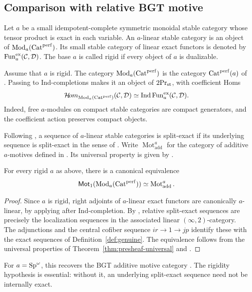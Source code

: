 \subsection{Comparison with relative BGT motive}

Let $a$ be a small idempotent-complete symmetric
monoidal stable category whose tensor product is
exact in each variable. An $a$-linear stable category
is an object of $\operatorname{Mod}_a(\operatorname{Cat}^{\mathrm{perf}})$.
Its small stable category of linear exact functors
is denoted by
$\operatorname{Fun}_a^{\mathrm{ex}}(\mathcal C,\mathcal D)$.
The base $a$ is called rigid if every object of $a$
is dualizable.


Assume that $a$ is rigid. The category
$\operatorname{Mod}_a(\operatorname{Cat}^{\mathrm{perf}})$ is the category
$\operatorname{Cat}^{\mathrm{perf}}(a)$ of
\citep[Definition~4.3]{HSS}.
Passing to Ind-completions makes it an object of
${2}\mathrm{Pr}_{\mathrm{st}}$, with coefficient Homs
\begin{equation}\label{eq:linear-Hom}
 \mathcal{H}\!om_{\operatorname{Mod}_a(\operatorname{Cat}^{\mathrm{perf}})}
       (\mathcal C,\mathcal D)
 \simeq\operatorname{Ind}\operatorname{Fun}_a^{\mathrm{ex}}(\mathcal C,\mathcal D).
\end{equation}
Indeed, free $a$-modules on compact stable
categories are compact generators, and the
coefficient action preserves compact objects.

\begin{definition}\label{def:relative-additive-motives}
Following \citep[Definition~5.3]{HSS}, a sequence
of $a$-linear stable categories is split-exact
if its underlying sequence is split-exact in
the sense of \citep[Definition~5.18]{BGT}.
Write $\operatorname{Mot}_{\mathrm{add}}^a$
for the category of additive $a$-motives
defined in \citep[Definition~5.8]{HSS}.
Its universal property is given by
\citep[Theorem~5.12]{HSS}.
\end{definition}

\begin{theorem}\label{thm:linear-normalization}
For every rigid $a$ as above, there is a
canonical equivalence
\begin{equation}\label{eq:BGT-normalization}
 \mathsf{Mot}_1(\operatorname{Mod}_a(\operatorname{Cat}^{\mathrm{perf}}))
 \simeq\operatorname{Mot}_{\mathrm{add}}^a.
\end{equation}
\end{theorem}


\begin{proof}
Since $a$ is rigid, right adjoints of
$a$-linear exact functors are canonically
$a$-linear, by applying
\citep[Proposition~3.11]{BBJ}
after Ind-completion.
By \citep[Proposition~5.4]{HSS}, relative
split-exact sequences are precisely the
localization sequences in the associated
linear $(\infty,2)$-category.
The adjunctions and the central cofiber
sequence $ir\to1\to jp$ identify these
with the exact sequences of
Definition~\ref{def:genuine}.
The equivalence follows from the universal
properties of
Theorem~\ref{thm:presheaf-universal}
and \citep[Theorem~5.12]{HSS}.
\end{proof}


For $a=\mathrm{Sp}^\omega$, this recovers the BGT
additive motive category \citep{BGT}.
The rigidity hypothesis is essential:
without it, an underlying split-exact
sequence need not be internally exact.